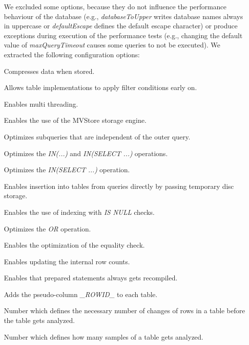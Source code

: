 We excluded some options, because they do not influence the performance behaviour of the database (e.g., \textit{databaseToUpper} writes database names always in uppercase or \textit{defaultEscape} defines the default escape character) or produce exceptions during execution of the performance tests (e.g., changing the default value of \textit{maxQueryTimeout} causes some queries to not be executed). We extracted the following configuration options:

\begin{description}[style=multiline,leftmargin=11em]
	\item [Compression] Compresses data when stored.
	\item [EarlyFilter] Allows table implementations to apply filter conditions early on.
	\item [MultiThreaded] Enables multi threading.
	\item [MvStore] Enables the use of the MVStore storage engine.
	\item [OptimizeEvalSubqueries] Optimizes subqueries that are independent of the outer query.
	\item [OptimizeInList] Optimizes the \textit{IN(...)} and \textit{IN(SELECT ...)} operations.
	\item [OptimizeInSelect] Optimizes the \textit{IN(SELECT ...)} operation.
	\item [OptimizeInsertFromSelect] Enables insertion into tables from queries directly by passing temporary disc storage.
	\item [OptimizeIsNull] Enables the use of indexing with \textit{IS NULL} checks.
	\item [OptimizeOr] Optimizes the \textit{OR} operation.
	\item [OptimizeTwoEquals] Enables the optimization of the equality check.
	\item [PageStoreInternalCount] Enables updating the internal row counts.
	\item [RecompileAlways] Enables that prepared statements always gets recompiled.
	\item [RowID] Adds the pseudo-column \textit{\_ROWID\_} to each table.
	\item [AnalyzeAuto] Number which defines the necessary number of changes of rows in a table before the table gets analyzed.
	\item [AnalyzeSample] Number which defines how many samples of a table gets analyzed.
\end{description}

